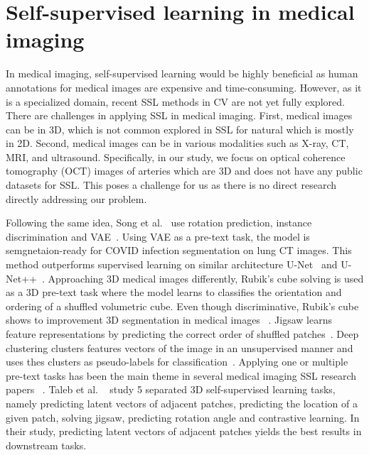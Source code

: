 \documentclass[a4paper,11pt,oneside]{report}
\begin{document}
\section{Self-supervised learning in medical imaging}
In medical imaging, self-supervised learning would be highly beneficial as human annotations for medical images are expensive and time-consuming. However, as it is a specialized domain, recent SSL methods in CV are not yet fully explored. There are challenges in applying SSL in medical imaging. First, medical images can be in 3D, which is not common explored in SSL for natural which is mostly in 2D. Second, medical images can be in various modalities such as X-ray, CT, MRI, and ultrasound. Specifically, in our study, we focus on optical coherence tomography (OCT) images of arteries which are 3D and does not have any public datasets for SSL. This poses a challenge for us as there is no direct research directly addressing our problem.

 Following the same idea, Song et al.~\cite{Song2022} use rotation prediction, instance discrimination and VAE~\cite{Kingma2013}. Using VAE as a pre-text task, the model is semgnetaion-ready for COVID infection segmentation on lung CT images. This method outperforms supervised learning on similar architecture U-Net~\cite{Ronneberger2015} and U-Net++~\cite{Zhou2020}. Approaching 3D medical images differently, Rubik's cube solving is used as a 3D pre-text task where the model learns to classifies the orientation and ordering of a shuffled volumetric cube. Even though discriminative, Rubik's cube shows to improvement 3D segmentation in medical images ~\cite{Zhuang2019}. Jigsaw learns feature representations by predicting the correct order of shuffled patches~\cite{Noroozi2016}. Deep clustering clusters features vectors of the image in an unsupervised manner and uses thes clusters as pseudo-labels for classification~\cite{Caron2018}. Applying one or multiple pre-text tasks has been the main theme in several medical imaging SSL research papers ~\cite{Zhou2021, Zhang2021, Dufumier2021}. Taleb et al. ~\cite{Taleb2020} study 5 separated 3D self-supervised learning tasks, namely predicting latent vectors of adjacent patches, predicting the location of a given patch, solving jigsaw, predicting rotation angle and contrastive learning. In their study, predicting latent vectors of adjacent patches yields the best results in downstream tasks.
\end{document}
